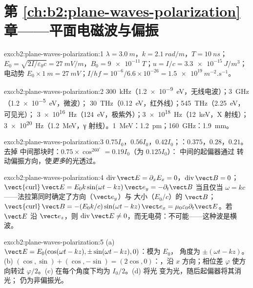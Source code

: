 \section*{第 \ref{ch:b2:plane-waves-polarization} 章——平面电磁波与偏振}

\begin{solution}{exo:b2:plane-waves-polarization:1}
$\lambda = \qty{3.0}{m}$，$k = \qty{2.1}{rad/m}$，$T = \qty{10}{ns}$；$E_0 = \sqrt{2I/\varepsilon_0c}
= \qty{27}{mV/m}$，$B_0 = \qty{9e-11}{T}$；$u = I/c = \qty{3.3e-15}{J/m^3}$；电动势
$E_0 \times \qty{1}{m} = \qty{27}{mV}$；$I/hf = 10^{-6}/6.6 \times 10^{-26} = \qty{1.5e19}{m^{-2}.s^{-1}}$。
\end{solution}

\begin{solution}{exo:b2:plane-waves-polarization:2}
\qty{300}{kHz}（\qty{1.2e-9}{eV}，无线电波）；\qty{3}{GHz}（\qty{1.2e-5}{eV}，微波）；
\qty{30}{THz}（\qty{0.12}{eV}，红外线）；\qty{545}{THz}（\qty{2.25}{eV}，可见光）；
\qty{3e16}{Hz}（\qty{124}{eV}，极紫外）；\qty{3e18}{Hz}（\qty{12}{keV}，X 射线）；
\qty{3e20}{Hz}（\qty{1.2}{MeV}，γ 射线）。\qty{1}{MeV}：\qty{1.2}{pm}；\qty{160}{GHz}：\qty{1.9}{mm}。
\end{solution}

\begin{solution}{exo:b2:plane-waves-polarization:3}
$0.75I_0$，$0.56I_0$，$0.42I_0$；：$0.375$，$0.28$，$0.21$。去掉
中间那块时：$0.75 \times \cos^260^\circ = 0.19I_0$（为 $0.125I_0$）：
中间的起偏器通过
转动偏振方向，使\emph{更多}的光透过。
\end{solution}

\begin{solution}{exo:b2:plane-waves-polarization:4}
$\operatorname{div}\vect E = \partial_xE_x = 0$，$\operatorname{div}\vect B = 0$；
$\operatorname{\vect{curl}}\vect E = E_0k\sin(\omega t - kz)\,\vect e_y = -\partial_t\vect B$ 当且仅当 $\omega =
kc$——法拉第同时确定了方向（$\vect e_y$）与
大小（$E_0/c$）的 $\vect B$；$\operatorname{\vect{curl}}\vect B = -(E_0k/c)\sin(\omega t - kz)\,\vect e_x
= \mu_0\varepsilon_0\partial_t\vect E$。若 $\vect E$ 沿 $\vect e_z$，则 $\operatorname{div}
\vect E \ne 0$，而无电荷：不可能——这种波是横波。
\end{solution}

\begin{solution}{exo:b2:plane-waves-polarization:5}
(a) $\vect E = E_0(\cos(\omega t - kz), \pm\sin(\omega t - kz), 0)$：模为 $E_0$，
角度为 $\pm(\omega t - kz)$。(b) $(\cos, \sin) + (\cos, -\sin) = (2\cos, 0)$：，沿 $x$ 方向；相位差 $\varphi$ 使方向转过 $\varphi/2$。(c)
在每个角度下均为 $I_0/2$。(d) 将光
变为光，随后起偏器将其消光；
仍为非偏振光。
\end{solution}

